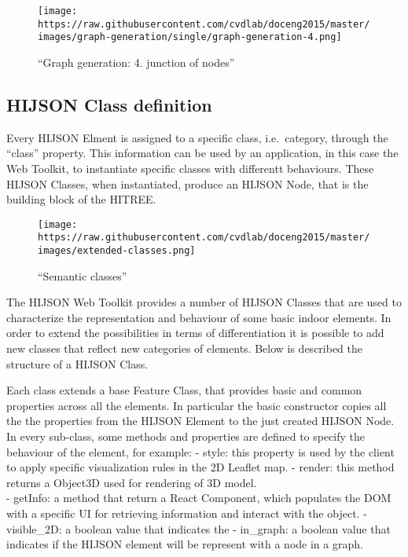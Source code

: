 \documentclass[]{article}
\begin{document}
\begin{figure}[htbp]
\centering
\texttt{[image: https://raw.githubusercontent.com/cvdlab/doceng2015/master/images/graph-generation/single/graph-generation-4.png]}
\caption{``Graph generation: 4. junction of nodes''}
\end{figure}

\subsection{HIJSON Class definition}\label{hijson-class-definition}

Every HIJSON Elment is assigned to a specific class, i.e.~category,
through the ``class'' property. This information can be used by an
application, in this case the Web Toolkit, to instantiate specific
classes with differentt behaviours. These HIJSON Classes, when
instantiated, produce an HIJSON Node, that is the building block of the
HITREE.

\begin{figure}[htbp]
\centering
\texttt{[image: https://raw.githubusercontent.com/cvdlab/doceng2015/master/images/extended-classes.png]}
\caption{``Semantic classes''}
\end{figure}

The HIJSON Web Toolkit provides a number of HIJSON Classes that are used
to characterize the representation and behaviour of some basic indoor
elements. In order to extend the possibilities in terms of
differentiation it is possible to add new classes that reflect new
categories of elements. Below is described the structure of a HIJSON
Class.

Each class extends a base Feature Class, that provides basic and common
properties across all the elements. In particular the basic constructor
copies all the the properties from the HIJSON Element to the just
created HIJSON Node. In every sub-class, some methods and properties are
defined to specify the behaviour of the element, for example: - style:
this property is used by the client to apply specific visualization
rules in the 2D Leaflet map. - render: this method returns a Object3D
used for rendering of 3D model.\\- getInfo: a method that return a React
Component, which populates the DOM with a specific UI for retrieving
information and interact with the object. - visible\_2D: a boolean value
that indicates the - in\_graph: a boolean value that indicates if the
HIJSON element will be represent with a node in a graph.
\end{document}
